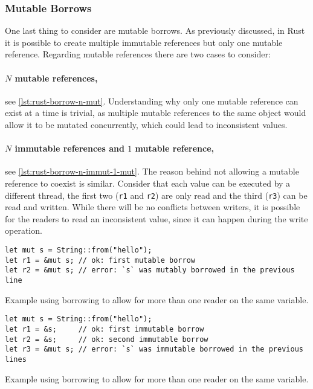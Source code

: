 \subsubsection*{Mutable Borrows}

One last thing to consider are mutable borrows.
As previously discussed, in Rust it is possible to create multiple immutable references but only one mutable reference.
Regarding mutable references there are two cases to consider:

\paragraph{$N$ mutable references,} see \autoref{lst:rust-borrow-n-mut}.
Understanding why only one mutable reference can exist at a time is trivial,
as multiple mutable references to the same object would allow it to be mutated concurrently,
which could lead to inconsistent values.

\paragraph{$N$ immutable references and $1$ mutable reference,} see \autoref{lst:rust-borrow-n-immut-1-mut}.
The reason behind not allowing a mutable reference to coexist is similar.
Consider that each value can be executed by a different thread,
the first two (\texttt{r1} and \texttt{r2}) are only read and the third (\texttt{r3}) can be read and written.
While there will be no conflicts between writers, it is possible for the readers to read an inconsistent value,
since it can happen during the write operation.

\begin{listing}
    \begin{verbatim}
let mut s = String::from("hello");
let r1 = &mut s; // ok: first mutable borrow
let r2 = &mut s; // error: `s` was mutably borrowed in the previous line
    \end{verbatim}
    \caption{Example using borrowing to allow for more than one reader on the same variable.}
    \label{lst:rust-borrow-n-mut}
\end{listing}

\begin{listing}
    \begin{verbatim}
let mut s = String::from("hello");
let r1 = &s;     // ok: first immutable borrow
let r2 = &s;     // ok: second immutable borrow
let r3 = &mut s; // error: `s` was immutable borrowed in the previous lines
    \end{verbatim}
    \caption{Example using borrowing to allow for more than one reader on the same variable.}
    \label{lst:rust-borrow-n-immut-1-mut}
\end{listing}


